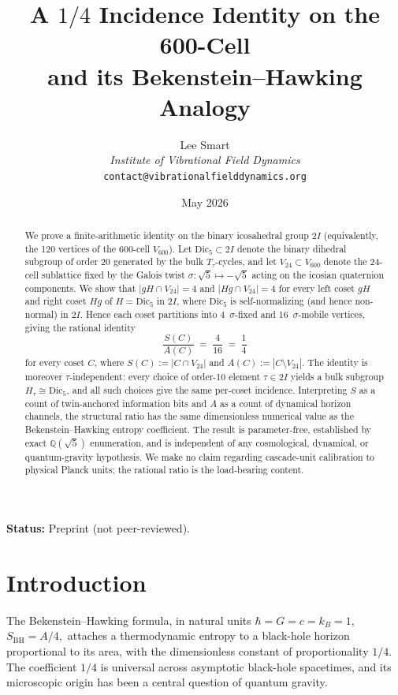 \documentclass[11pt]{article}
\title{A $1/4$ Incidence Identity on the 600-Cell\\ and its Bekenstein--Hawking Analogy}
\author{%
  Lee Smart \\[3pt]
  \textit{Institute of Vibrational Field Dynamics} \\[2pt]
  \texttt{contact@vibrationalfielddynamics.org}}
\date{May 2026}
\newcommand{\twoI}{2I}
\newcommand{\Vsixhundred}{V_{600}}
\newcommand{\Dicfive}{\mathrm{Dic}_5}
\newcommand{\Vtwentyfour}{V_{24}}
\newcommand{\Ttau}{T_\tau}
\newcommand{\sigmaG}{\sigma}
\begin{document}
\maketitle

\noindent\textbf{Status:} Preprint (not peer-reviewed).

\begin{abstract}
We prove a finite-arithmetic identity on the binary icosahedral group
$\twoI$ (equivalently, the 120 vertices of the 600-cell $\Vsixhundred$).
Let $\Dicfive \subset \twoI$ denote the binary dihedral subgroup of order
$20$ generated by the bulk $\Ttau$-cycles, and let $\Vtwentyfour \subset
\Vsixhundred$ denote the 24-cell sublattice fixed by the Galois twist
$\sigmaG : \sqrt{5} \mapsto -\sqrt{5}$ acting on the icosian
quaternion components. We show that
$|gH \cap \Vtwentyfour| = 4$ and $|Hg \cap \Vtwentyfour| = 4$ for every
left coset $gH$ and right coset $Hg$ of $H = \Dicfive$ in $\twoI$, where
$\Dicfive$ is self-normalizing (and hence non-normal) in $\twoI$. Hence
each coset partitions into 4~$\sigmaG$-fixed and 16~$\sigmaG$-mobile
vertices, giving the rational identity
\[
  \frac{S(C)}{A(C)} \;=\; \frac{4}{16} \;=\; \frac{1}{4}
\]
for every coset $C$, where $S(C) := |C \cap \Vtwentyfour|$ and
$A(C) := |C \setminus \Vtwentyfour|$. The identity is moreover
$\tau$-independent: every choice of order-10 element $\tau \in \twoI$
yields a bulk subgroup $H_\tau \cong \Dicfive$, and all such choices
give the same per-coset incidence. Interpreting $S$ as a count of
twin-anchored information bits and $A$ as a count of dynamical horizon
channels, the structural ratio has the same dimensionless numerical
value as the Bekenstein--Hawking entropy coefficient. The result is
parameter-free, established by exact $\mathbb{Q}(\sqrt{5})$ enumeration,
and is independent of any cosmological, dynamical, or quantum-gravity
hypothesis. We make no claim regarding cascade-unit calibration to
physical Planck units; the rational ratio is the load-bearing content.
\end{abstract}

\section{Introduction}\label{sec:intro}

The Bekenstein--Hawking formula, in natural units
$\hbar = G = c = k_B = 1$,
\(
  S_{\mathrm{BH}} = A/4,
\)
\citep{Bekenstein1973,Hawking1975} attaches a thermodynamic entropy
to a black-hole horizon proportional to its area, with the
dimensionless constant of proportionality $1/4$. The coefficient $1/4$ is universal
across asymptotic black-hole spacetimes, and its microscopic origin has
been a central question of quantum gravity.
\end{document}
